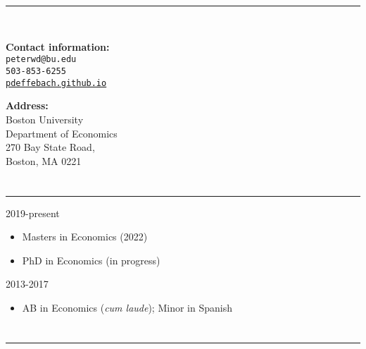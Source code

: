 \documentclass[12pt]{article}
\newenvironment{customitemize}
{ \begin{itemize}[leftmargin=\parindent, topsep = 1pt, itemsep = -1pt] }
{\end{itemize} }
\begin{document}
\normalsize
\singlespacing


\newcommand{\link}[2]{{\color{blue}\href{#1}{#2}}}

\section*{\centering {}} 
\begin{center}
\rule{3in}{1pt} \\
\vspace*{0.1in}

\begin{minipage}[t]{3in}
\textbf{Contact information:} \\
\texttt{peterwd@bu.edu} \\
\texttt{503-853-6255} \\
\href{https://pdeffebach.github.io/}{\texttt{pdeffebach.github.io}} \end{minipage}
\hfill
\begin{minipage}[t]{2.0in}
\textbf{Address:}\\
Boston University \\
Department of Economics \\
270 Bay State Road, \\
Boston, MA 0221
\end{minipage}

\end{center} 

\section*{}
\noindent \rule{\textwidth}{1pt} 
  \hfill 2019-present 
\begin{customitemize}
	\item Masters in Economics (2022)
	\item PhD in Economics (in progress)
\end{customitemize}
  \hfill 2013-2017 
\begin{customitemize}
	\item AB in Economics (\emph{cum laude}); Minor in Spanish
\end{customitemize}

\section*{}
\noindent \rule{\textwidth}{1pt} 
\end{document}
